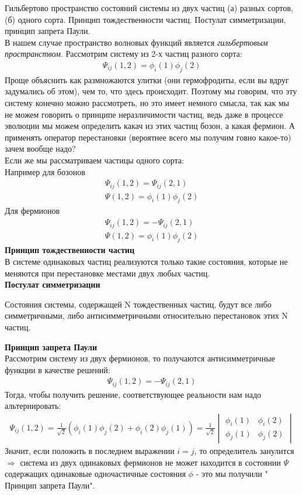 \documentclass[__main__.tex]{subfiles}
\begin{document}
Гильбертово пространство состояний системы из двух частиц (а) разных сортов, (б) одного сорта. Принцип тождественности частиц. Постулат симметризации, принцип запрета Паули.\\ 

В нашем случае пространство волновых функций является \textit{гильбертовым пространством}. Рассмотрим систему из 2-х частиц разного сорта:\\
\begin{gather}
\Psi_{ij}(1,2) = \phi_i(1)\phi_j(2)
\end{gather}
Проще объяснить как размножаются улитки (они гермофродиты, если вы вдруг задумались об этом), чем то, что здесь происходит. Поэтому мы говорим, что эту систему конечно можно рассмотреть, но это имеет немного смысла, так как мы не можем говорить о принципе неразличимости частиц, ведь даже в процессе эволюции мы можем определить какач из этих частиц бозон, а какая фермион. А применять оператор перестановки (вероятнее всего мы получим говно какое-то) зачем вообще надо?\\
Если же мы рассматриваем частицы одного сорта:\\
Например для бозонов 
\begin{gather}
\Psi_{ij}(1,2)= \Psi_{ij}(2,1)\\
\Psi(1,2) = \phi_i(1)\phi_j(2)
\end{gather}
Для фермионов
\begin{gather}
\Psi_{ij}(1,2) = -\Psi_{ij}(2,1)\\
\Psi(1,2) = \phi_i(1)\phi_j(2)
\end{gather}
\textbf{Принцип тождественности частиц}\\
В системе одинаковых частиц реализуются только такие состояния, которые не меняются при перестановке местами двух любых частиц.\\
\textbf{Постулат симметризации}\\
\begin{definition}
Состояния системы, содержащей N тождественных частиц, будут все либо симметричными, либо антисимметричными относительно перестановок этих N частиц.\\
\end{definition}
\textbf{Принцип запрета Паули}\\
Рассмотрим систему из двух фермионов, то получаются антисимметричные функции в качестве решений:
\begin{gather}
\Psi_{ij}(1,2) = -\Psi_{ij}(2,1)
\end{gather}
Тогда, чтобы получить решение, соответствующее реальности нам надо альтернировать:\\
\begin{gather}
\Psi_{ij}(1,2)=\frac{1}{\sqrt{2}}(\phi_i(1)\phi_j(2)+\phi_i(2)\phi_j(1)) = \frac{1}{\sqrt{2}} \begin{vmatrix}
\phi_i(1) & \phi_i(2)\\
\phi_j(1) & \phi_j(2)
\end{vmatrix}
\end{gather}
Значит, если положить в последнем выражении $i=j$, то определитель занулится $\Longrightarrow$ система из двух одинаковых фермионов не может находится в состоянии $\Psi$ содержащих одинаковые одночастичные состояния $\phi$ - это мы получили " Принцип запрета Паули".
\end{document}
